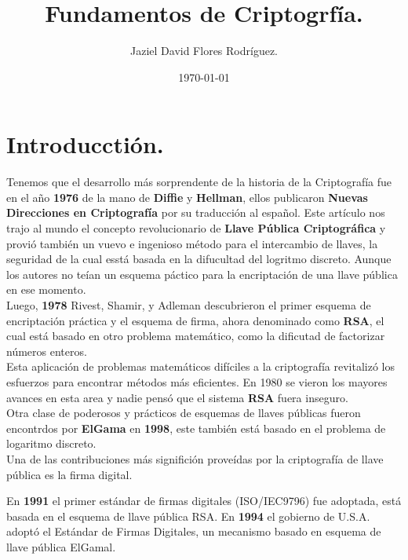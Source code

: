\documentclass[12pt]{article}
\author{Jaziel David Flores Rodríguez.}
\date{\today}
\title{Fundamentos de Criptogrfía.}
\begin{document}
\maketitle

\section{Introducctión.}

Tenemos que el desarrollo más sorprendente de la historia de la Criptografía fue en el año \textbf{1976}
de la mano de \textbf{Diffie} y \textbf{Hellman}, ellos publicaron \textbf{Nuevas Direcciones en Criptografía} por su traducción al español. Este artículo nos trajo al mundo el concepto revolucionario de \textbf{Llave Pública Criptográfica} y provió también un vuevo e ingenioso método para el intercambio de llaves, la seguridad de la cual esstá basada en la difucultad del logritmo discreto. Aunque los autores no teían un esquema páctico para la encriptación de una llave pública en ese momento. \\ 

Luego, \textbf{1978} Rivest, Shamir, y Adleman descubrieron el primer esquema de encriptación práctica y el esquema de firma, ahora denominado como \textbf{RSA}, el cual está basado en otro problema matemático, como la dificutad de factorizar números enteros.\\

Esta aplicación de problemas matemáticos difíciles a la criptografía revitalizó los esfuerzos para encontrar métodos más eficientes. En 1980 se  vieron los mayores avances en esta area y nadie pensó que el sistema \textbf{RSA} fuera inseguro. \\ 

Otra clase de poderosos y prácticos de esquemas de llaves públicas fueron encontrdos por \textbf{ElGama} en \textbf{1998}, este también está basado en el problema de logaritmo discreto. \\


Una de las contribuciones más significión proveídas por la criptografía de llave pública es la firma digital.\\ 

\pagebreak 

En \textbf{1991} el primer estándar de firmas digitales (ISO/IEC9796) fue adoptada, está basada en el esquema de llave pública RSA. En \textbf{1994} el gobierno de U.S.A. adoptó el Estándar de Firmas Digitales, un mecanismo basado en esquema de llave pública ElGamal.\\
\end{document}
